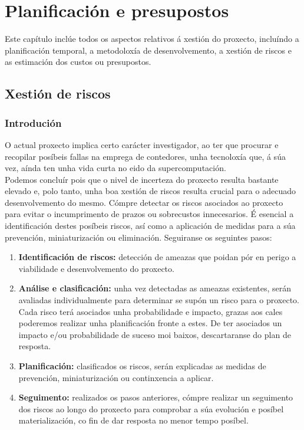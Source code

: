 \chapter{Planificación e presupostos}
\minitoc
\clearpage

Este capítulo inclúe todos os aspectos relativos á xestión do proxecto, incluíndo a planificación temporal, a metodoloxía de desenvolvemento, a xestión de riscos e as estimación dos custos ou presupostos.

\section{Xestión de riscos}

\subsection{Introdución}

O actual proxecto implica certo carácter investigador, ao ter que procurar e recopilar posíbeis fallas na emprega de contedores, unha tecnoloxía que, á súa vez, aínda ten unha vida curta no eido da supercomputación.\\

Podemos concluír pois que o nivel de incerteza do proxecto resulta bastante elevado e, polo tanto, unha boa xestión de riscos resulta crucial para o adecuado desenvolvemento do mesmo. Cómpre detectar os riscos asociados ao proxecto para evitar o incumprimento de prazos ou sobrecustos innecesarios. É esencial a identificación destes posíbeis riscos, así como a aplicación de medidas para a súa prevención, miniaturización ou eliminación. Seguiranse os seguintes pasos:

\begin{enumerate}
    \item \textbf{Identificación de riscos:} detección de ameazas que poidan pór en perigo a viabilidade e desenvolvemento do proxecto.
    
    \item \textbf{Análise e clasificación:} unha vez detectadas as ameazas existentes, serán avaliadas individualmente para determinar se supón un risco para o proxecto. Cada risco terá asociados unha probabilidade e impacto, grazas aos cales poderemos realizar unha planificación fronte a estes. De ter asociados un impacto e/ou probabilidade de suceso moi baixos, descartaranse do plan de resposta.
    
    \item \textbf{Planificación:} clasificados os riscos, serán explicadas as medidas de prevención, miniaturización ou continxencia a aplicar.
    
    \item \textbf{Seguimento:} realizados os pasos anteriores, cómpre realizar un seguimento dos riscos ao longo do proxecto para comprobar a súa evolución e posíbel materialización, co fin de dar resposta no menor tempo posíbel.
\end{enumerate}

